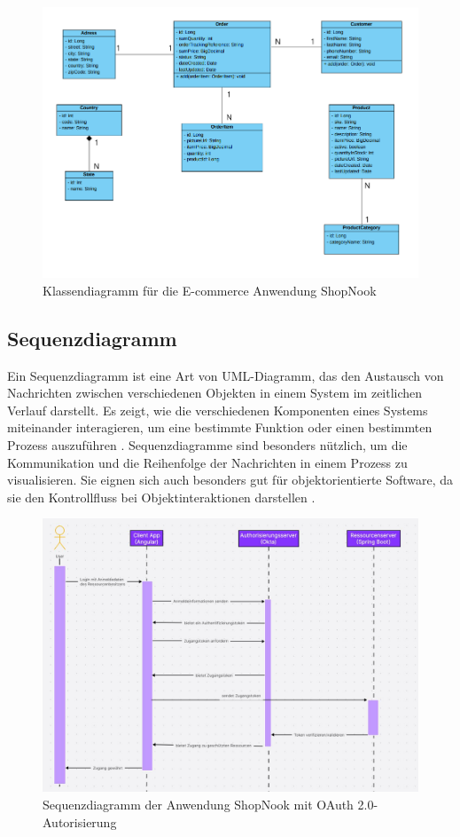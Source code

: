 \begin{figure}[h]
	\centering
	\includegraphics[width=\textwidth]{images/ClassDiagram.png}
	\caption{Klassendiagramm für die E-commerce Anwendung ShopNook}
	\label{fig:class_diagram}
\end{figure}

\subsection{Sequenzdiagramm}

Ein Sequenzdiagramm ist eine Art von UML-Diagramm, das den Austausch von Nachrichten zwischen verschiedenen Objekten in einem System im zeitlichen Verlauf darstellt. Es zeigt, wie die verschiedenen Komponenten eines Systems miteinander interagieren, um eine bestimmte Funktion oder einen bestimmten Prozess auszuführen \cite{Sequenzdiagramm:2021}.
Sequenzdiagramme sind besonders nützlich, um die Kommunikation und die Reihenfolge der Nachrichten in einem Prozess zu visualisieren. Sie eignen sich auch besonders gut für objektorientierte Software, da sie den Kontrollfluss bei Objektinteraktionen darstellen \cite[S.28]{swain2010test}. 
\begin{figure}[h]
	\centering
	\includegraphics[width=\textwidth]{images/SequenceDiagram.jpg}
	\caption{Sequenzdiagramm der Anwendung ShopNook mit OAuth 2.0-Autorisierung}
	\label{fig:Sequence-Diagram} 
\end{figure}

